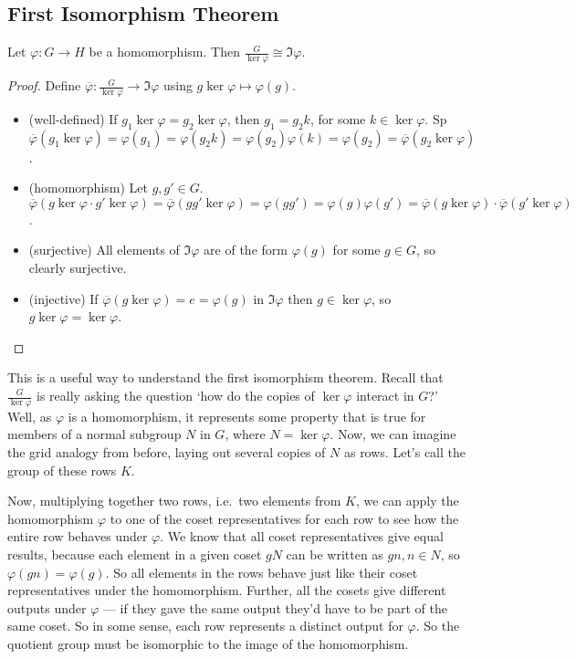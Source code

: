 \subsection{First Isomorphism Theorem}
\begin{theorem}
	Let \(\varphi: G \to H\) be a homomorphism. Then \(\frac{G}{\ker \varphi} \cong \Im \varphi\).
\end{theorem}
\begin{proof}
	Define \(\overline \varphi: \frac{G}{\ker \varphi} \to \Im \varphi\) using \(g \ker \varphi \mapsto \varphi(g)\).
	\begin{itemize}
		\item (well-defined) If \(g_1 \ker \varphi = g_2 \ker \varphi\), then \(g_1 = g_2k\), for some \(k \in \ker \varphi\). Sp \(\overline\varphi(g_1 \ker \varphi) = \varphi(g_1) = \varphi(g_2k) = \varphi(g_2)\varphi(k) = \varphi(g_2) = \overline\varphi(g_2 \ker \varphi)\).
		\item (homomorphism) Let \(g, g' \in G\). \(\overline\varphi(g \ker \varphi \cdot g' \ker \varphi) = \overline\varphi(gg' \ker \varphi) = \varphi(gg') = \varphi(g)\varphi(g') = \overline\varphi(g\ker\varphi) \cdot \overline\varphi(g'\ker\varphi)\).
		\item (surjective) All elements of \(\Im \varphi\) are of the form \(\varphi(g)\) for some \(g \in G\), so clearly surjective.
		\item (injective) If \(\overline\varphi(g \ker \varphi) = e = \varphi(g)\) in \(\Im \varphi\) then \(g \in \ker \varphi\), so \(g \ker \varphi = \ker \varphi\).
	\end{itemize}
\end{proof}
This is a useful way to understand the first isomorphism theorem. Recall that \(\frac{G}{\ker \varphi}\) is really asking the question `how do the copies of \(\ker \varphi\) interact in \(G\)?' Well, as \(\varphi\) is a homomorphism, it represents some property that is true for members of a normal subgroup \(N\) in \(G\), where \(N = \ker \varphi\). Now, we can imagine the grid analogy from before, laying out several copies of \(N\) as rows. Let's call the group of these rows \(K\).

Now, multiplying together two rows, i.e.\ two elements from \(K\), we can apply the homomorphism \(\varphi\) to one of the coset representatives for each row to see how the entire row behaves under \(\varphi\). We know that all coset representatives give equal results, because each element in a given coset \(gN\) can be written as \(gn, n \in N\), so \(\varphi(gn) = \varphi(g)\). So all elements in the rows behave just like their coset representatives under the homomorphism. Further, all the cosets give different outputs under \(\varphi\) --- if they gave the same output they'd have to be part of the same coset. So in some sense, each row represents a distinct output for \(\varphi\). So the quotient group must be isomorphic to the image of the homomorphism.

